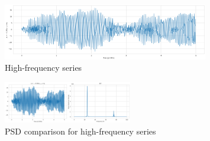 \documentclass[11pt, letterpaper]{article}
\begin{document}
\begin{figure}[!h]
  \centering
  \includegraphics[width=0.8\textwidth]{4-3.png}
  \captionsetup{justification=centering}
  \caption{High-frequency series}
\end{figure}

\begin{figure}[!h]
  \centering
  \includegraphics[width=0.5\textwidth]{4-2.png}
  \captionsetup{justification=centering}
  \caption{PSD comparison for high-frequency series}
\end{figure}
\end{document}
